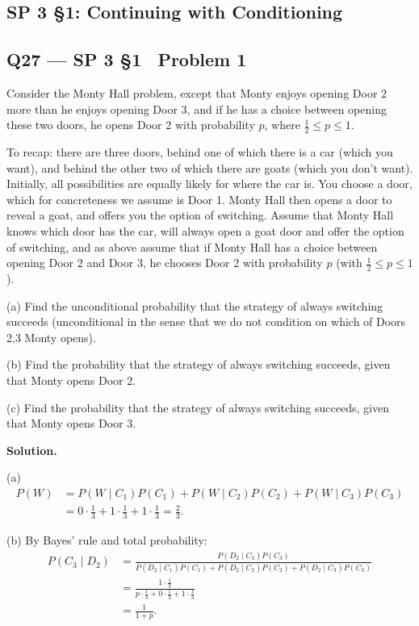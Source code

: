\documentclass[11pt]{article}
\begin{document}
\subsection{SP 3 \S1: Continuing with Conditioning}

\subsection*{Q27 --- SP 3 \S1 \textperiodcentered\ Problem 1}
\begin{qbox}
Consider the Monty Hall problem, except that Monty enjoys opening Door 2 more than he enjoys opening Door 3, and if he has a choice between opening these two doors, he opens Door 2 with probability $p$, where $\frac12 \leq p \leq 1$.

To recap: there are three doors, behind one of which there is a car (which you want), and behind the other two of which there are goats (which you don't want). Initially, all possibilities are equally likely for where the car is. You choose a door, which for concreteness we assume is Door 1. Monty Hall then opens a door to reveal a goat, and offers you the option of switching. Assume that Monty Hall knows which door has the car, will always open a goat door and offer the option of switching, and as above assume that if Monty Hall has a choice between opening Door 2 and Door 3, he chooses Door 2 with probability $p$ (with $\frac12 \leq p \leq 1$).

(a) Find the unconditional probability that the strategy of always switching succeeds (unconditional in the sense that we do not condition on which of Doors 2,3 Monty opens).

(b) Find the probability that the strategy of always switching succeeds, given that Monty opens Door 2.

(c) Find the probability that the strategy of always switching succeeds, given that Monty opens Door 3.
\end{qbox}
\textbf{Solution.}

(a)
\begin{align*}
P(W) &= P(W\mid C_1)P(C_1)+P(W\mid C_2)P(C_2)+P(W\mid C_3)P(C_3) \\
&= 0\cdot\frac13+1\cdot\frac13+1\cdot\frac13 = \frac23.
\end{align*}

(b) By Bayes' rule and total probability:
\begin{align*}
P(C_3\mid D_2) &= \frac{P(D_2\mid C_3)P(C_3)}{P(D_2\mid C_1)P(C_1)+P(D_2\mid C_2)P(C_2)+P(D_2\mid C_3)P(C_3)} \\
&= \frac{1\cdot\tfrac13}{p\cdot\tfrac13+0\cdot\tfrac13+1\cdot\tfrac13} \\
&= \frac{1}{1+p}.
\end{align*}
\end{document}
